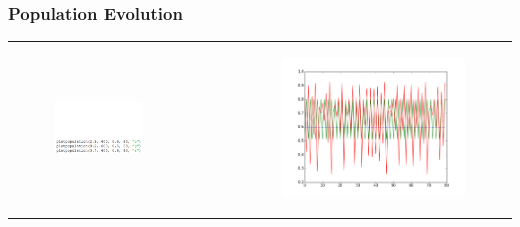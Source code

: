 \documentclass[ignorenonframetext]{beamer}
\begin{document}
\begin{frame}
\frametitle{Population Evolution}
\begin{tabular}{cr}
\begin{minipage}{0.4\textwidth}
\begin{figure}[htbp]
\vspace*{-15pt}
\includegraphics[width = \textwidth]{population-development1-code}
\end{figure}
\end{minipage}

&\begin{minipage}[t]{0.6\textwidth}

\begin{figure}[htbp]
\vspace*{-45pt}
\includegraphics[width = 0.8\textwidth]{population-development1}
\end{figure}
\end{minipage}


\end{tabular}
\end{frame}
\end{document}
